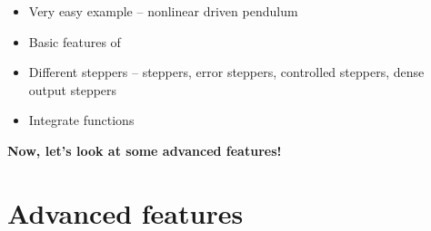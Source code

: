 \begin{frame}
 

 \vspace{2ex}
 \begin{itemize}
  \item Very easy example -- nonlinear driven pendulum
  \item Basic features of \odeint
  \item Different steppers -- steppers, error steppers, controlled steppers, dense output steppers
  \item Integrate functions
 \end{itemize}

 \vspace{2ex}

 \centerline{\bf Now, let's look at some advanced features!}

\end{frame}




\section{Advanced features}






